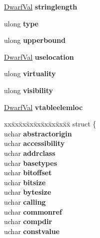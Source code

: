 \begin{DoxyCompactItemize}
\mbox{\label{struct_dwarf_attrs_a8b25842c82383b41825bcac63065d0f1}} 
\hyperlink{union_dwarf_val}{Dwarf\+Val} {\bfseries stringlength}
\item 
\mbox{\label{struct_dwarf_attrs_a6f99fad3013e2866dbbb08da969d3196}} 
ulong {\bfseries type}
\item 
\mbox{\label{struct_dwarf_attrs_accfe41c2fc2d9c67fb2f27b433db9a5b}} 
ulong {\bfseries upperbound}
\item 
\mbox{\label{struct_dwarf_attrs_a539bb2e019a3087b68768c611b38f064}} 
\hyperlink{union_dwarf_val}{Dwarf\+Val} {\bfseries uselocation}
\item 
\mbox{\label{struct_dwarf_attrs_acbc3fb122a91d90582d8fb01e1f75047}} 
ulong {\bfseries virtuality}
\item 
\mbox{\label{struct_dwarf_attrs_a7b4a5badc924a20626adb29daefb1e08}} 
ulong {\bfseries visibility}
\item 
\mbox{\label{struct_dwarf_attrs_a6d4740bd0462222ca81d8f116358da9c}} 
\hyperlink{union_dwarf_val}{Dwarf\+Val} {\bfseries vtableelemloc}
\item 
\mbox{\label{struct_dwarf_attrs_a6a9265233702f6f664c02da2243e946e}} 
\begin{tabbing}
xx\=xx\=xx\=xx\=xx\=xx\=xx\=xx\=xx\=\kill
struct \{\\
\>uchar {\bfseries abstractorigin}\\
\>uchar {\bfseries accessibility}\\
\>uchar {\bfseries addrclass}\\
\>uchar {\bfseries basetypes}\\
\>uchar {\bfseries bitoffset}\\
\>uchar {\bfseries bitsize}\\
\>uchar {\bfseries bytesize}\\
\>uchar {\bfseries calling}\\
\>uchar {\bfseries commonref}\\
\>uchar {\bfseries compdir}\\
\>uchar {\bfseries constvalue}\\

\end{tabbing}
\end{DoxyCompactItemize}
